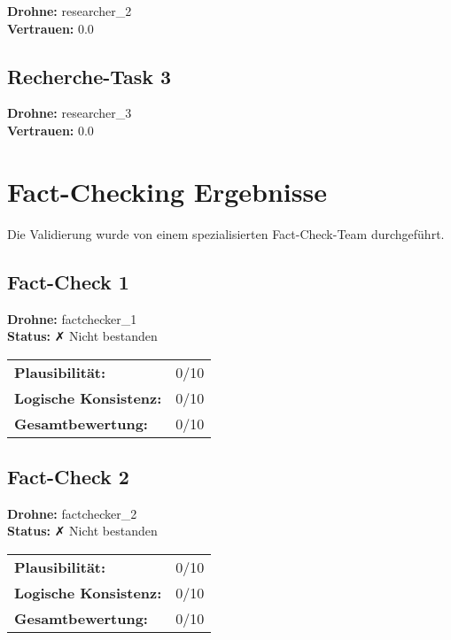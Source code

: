 \documentclass[12pt,a4paper]{article}
\begin{document}
\textbf{Drohne:} researcher\_2\\
\textbf{Vertrauen:} 0.0%

\subsection{Recherche-Task 3}

\textbf{Drohne:} researcher\_3\\
\textbf{Vertrauen:} 0.0%


\newpage
\section{Fact-Checking Ergebnisse}

Die Validierung wurde von einem spezialisierten Fact-Check-Team durchgeführt.


\subsection{Fact-Check 1}

\textbf{Drohne:} factchecker\_1\\
\textbf{Status:} ✗ Nicht bestanden\\

\begin{tabular}{ll}
\textbf{Plausibilität:} & 0/10 \\
\textbf{Logische Konsistenz:} & 0/10 \\
\textbf{Gesamtbewertung:} & 0/10 \\
\end{tabular}

\subsection{Fact-Check 2}

\textbf{Drohne:} factchecker\_2\\
\textbf{Status:} ✗ Nicht bestanden\\

\begin{tabular}{ll}
\textbf{Plausibilität:} & 0/10 \\
\textbf{Logische Konsistenz:} & 0/10 \\
\textbf{Gesamtbewertung:} & 0/10 \\
\end{tabular}
\end{document}
